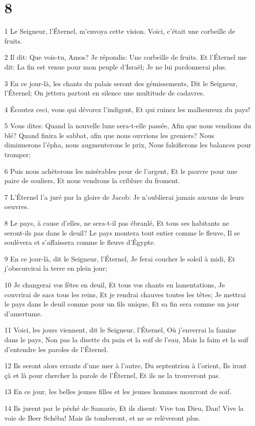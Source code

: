 \chapter{8}

\par 1 Le Seigneur, l'Éternel, m'envoya cette vision. Voici, c'était une corbeille de fruits.
\par 2 Il dit: Que vois-tu, Amos? Je répondis: Une corbeille de fruits. Et l'Éternel me dit: La fin est venue pour mon peuple d'Israël; Je ne lui pardonnerai plus.
\par 3 En ce jour-là, les chants du palais seront des gémissements, Dit le Seigneur, l'Éternel; On jettera partout en silence une multitude de cadavres.
\par 4 Écoutez ceci, vous qui dévorez l'indigent, Et qui ruinez les malheureux du pays!
\par 5 Vous dites: Quand la nouvelle lune sera-t-elle passée, Afin que nous vendions du blé? Quand finira le sabbat, afin que nous ouvrions les greniers? Nous diminuerons l'épha, nous augmenterons le prix, Nous falsifierons les balances pour tromper;
\par 6 Puis nous achèterons les misérables pour de l'argent, Et le pauvre pour une paire de souliers, Et nous vendrons la criblure du froment.
\par 7 L'Éternel l'a juré par la gloire de Jacob: Je n'oublierai jamais aucune de leurs oeuvres.
\par 8 Le pays, à cause d'elles, ne sera-t-il pas ébranlé, Et tous ses habitants ne seront-ils pas dans le deuil? Le pays montera tout entier comme le fleuve, Il se soulèvera et s'affaissera comme le fleuve d'Égypte.
\par 9 En ce jour-là, dit le Seigneur, l'Éternel, Je ferai coucher le soleil à midi, Et j'obscurcirai la terre en plein jour;
\par 10 Je changerai vos fêtes en deuil, Et tous vos chants en lamentations, Je couvrirai de sacs tous les reins, Et je rendrai chauves toutes les têtes; Je mettrai le pays dans le deuil comme pour un fils unique, Et sa fin sera comme un jour d'amertume.
\par 11 Voici, les jours viennent, dit le Seigneur, l'Éternel, Où j'enverrai la famine dans le pays, Non pas la disette du pain et la soif de l'eau, Mais la faim et la soif d'entendre les paroles de l'Éternel.
\par 12 Ils seront alors errants d'une mer à l'autre, Du septentrion à l'orient, Ils iront çà et là pour chercher la parole de l'Éternel, Et ils ne la trouveront pas.
\par 13 En ce jour, les belles jeunes filles et les jeunes hommes mourront de soif.
\par 14 Ils jurent par le péché de Samarie, Et ils disent: Vive ton Dieu, Dan! Vive la voie de Beer Schéba! Mais ils tomberont, et ne se relèveront plus.


